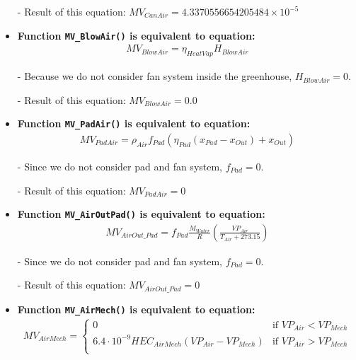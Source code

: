 \documentclass[a4paper]{article}
\numberwithin{equation}{section}
\begin{document}
\begin{itemize}
  \item[-] Result of this equation: \( MV_{CanAir} = 4.3370556654205484 \times 10^{-5} \)

  \item \textbf{Function \texttt{MV\_BlowAir()} is equivalent to equation:}
        \begin{align*}
          MV_{BlowAir} = \eta_{HeatVap} H_{BlowAir}
        \end{align*}

  \item[-] Because we do not consider fan system inside the greenhouse, \( H_{BlowAir} = 0 \).
  \item[-] Result of this equation: \( MV_{BlowAir} = 0.0 \)

  \item \textbf{Function \texttt{MV\_PadAir()} is equivalent to equation:}
        \begin{align*}
          MV_{PadAir} = \rho_{Air} f_{Pad} (\eta_{Pad} (x_{Pad} - x_{Out}) + x_{Out})
        \end{align*}

  \item[-] Since we do not consider pad and fan system, \( f_{Pad} = 0 \).
  \item[-] Result of this equation: \( MV_{PadAir} = 0 \)

  \item \textbf{Function \texttt{MV\_AirOutPad()} is equivalent to equation:}
        \begin{align*}
          MV_{AirOut\_Pad} = f_{Pad}
          \frac{M_{Water}}{R} \left(\frac{VP_{Air}}{T_{Air} + 273.15}\right)
        \end{align*}

  \item[-] Since we do not consider pad and fan system, \( f_{Pad} = 0 \).
  \item[-] Result of this equation: \( MV_{AirOut\_Pad} = 0 \)

  \item \textbf{Function \texttt{MV\_AirMech()} is equivalent to equation:}
        \begin{align*}
          MV_{AirMech} = \begin{cases}
            0                                                     & \text{if~} VP_{Air} < VP_{Mech} \\
            6.4 \cdot 10^{-9} HEC_{AirMech}(VP_{Air} - VP_{Mech}) & \text{if~} VP_{Air} > VP_{Mech} \\
          \end{cases}
        \end{align*}


\end{itemize}
\end{document}
